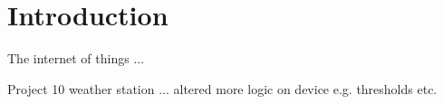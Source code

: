 \section{Introduction}

The internet of things ...

Project 10 weather station ... altered more logic on device e.g. thresholds etc.

\pagebreak